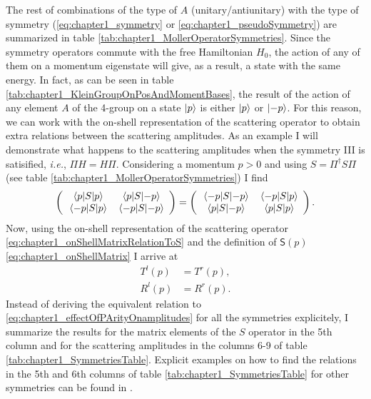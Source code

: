 %
The rest of combinations of the type of $A$ (unitary/antiunitary) with the type of symmetry (\eqref{eq:chapter1_symmetry} or \eqref{eq:chapter1_pseudoSymmetry}) are summarized in table \ref{tab:chapter1_MollerOperatorSymmetries}. Since the symmetry operators commute with the free Hamiltonian $H_0$, the action of any of them on a momentum eigenstate will give, as a result, a state with the same energy. In fact, as can be seen in table \ref{tab:chapter1_KleinGroupOnPosAndMomentBases}, the result of the action of any element $A$ of the 4-group on a state $\ket{p}$ is either $\ket{p}$ or $\ket{-p}$. For this reason, we can work with the on-shell representation of the scattering operator to obtain extra relations between the scattering amplitudes. As an example I will demonstrate what happens to the scattering amplitudes when the symmetry III is satisified, \textit{i.e.}, $\Pi H = H \Pi$. Considering a momentum $p>0$ and using $S = \Pi^{\dagger}S \Pi$ (see table \ref{tab:chapter1_MollerOperatorSymmetries}) I find
%
\begin{equation}
  \left(
  \begin{array}{cc}
    \mel{p}{S}{p} & \mel{p}{S}{-p}\\
    \mel{-p}{S}{p} & \mel{-p}{S}{-p}
  \end{array}
  \right)
  =
  \left(
  \begin{array}{cc}
    \mel{-p}{S}{-p} & \mel{-p}{S}{p}\\
    \mel{p}{S}{-p} & \mel{p}{S}{p}
  \end{array}
  \right).
\end{equation}
%
Now, using the on-shell representation of the scattering operator \eqref{eq:chapter1_onShellMatrixRelationToS} and the definition of $\mathsf{S}(p)$ \eqref{eq:chapter1_onShellMatrix} I arrive at
%
\begin{align}
  T^l(p) &= T^r(p),\nonumber\\
  R^l(p) &= R^r(p).
  \label{eq:chapter1_effectOfPArityOnamplitudes}
\end{align}
%
Instead of deriving the equivalent relation to \eqref{eq:chapter1_effectOfPArityOnamplitudes} for all the symmetries explicitely, I summarize the results for the matrix elements of the $S$ operator in the 5th column and for the scattering amplitudes in the columns 6-9 of table \ref{tab:chapter1_SymmetriesTable}. Explicit examples on how to find the relations in the 5th and 6th columns of table \ref{tab:chapter1_SymmetriesTable} for other symmetries can be found in \cite{Muga2004}.

